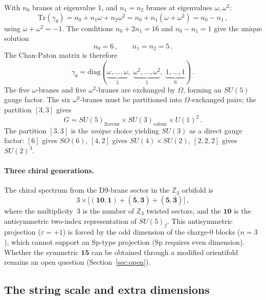 \documentclass[12pt,a4paper]{article}
\begin{document}
With $n_0$ branes at eigenvalue 1, and $n_1 = n_2$ branes at
eigenvalues $\omega, \omega^2$:
\begin{equation}
  \mathrm{Tr}(\gamma_\theta) = n_0 + n_1\omega + n_2\omega^2
  = n_0 + n_1(\omega + \omega^2) = n_0 - n_1\,,
\end{equation}
using $\omega + \omega^2 = -1$.  The conditions $n_0 + 2n_1 = 16$ and
$n_0 - n_1 = 1$ give the unique solution
\begin{equation}
  n_0 = 6\,,\qquad n_1 = n_2 = 5\,.
\end{equation}
The Chan-Paton matrix is therefore
\begin{equation}
  \gamma_\theta = \mathrm{diag}(\underbrace{\omega,\ldots,\omega}_{5},\;
    \underbrace{\omega^2,\ldots,\omega^2}_{5},\;
    \underbrace{1,\ldots,1}_{6})\,.
\end{equation}
The five $\omega$-branes and five $\omega^2$-branes are exchanged by
$\Omega$, forming an $SU(5)$ gauge factor.  The six $\omega^0$-branes
must be partitioned into $\Omega$-exchanged pairs; the partition
$[3,3]$ gives
\begin{equation}
  G = SU(5)_{\mathrm{flavour}} \times SU(3)_{\mathrm{colour}}
  \times U(1)^2\,.
\end{equation}
The partition $[3,3]$ is the \emph{unique} choice yielding $SU(3)$
as a direct gauge factor: $[6]$ gives $SO(6)$, $[4,2]$ gives
$SU(4) \times SU(2)$, $[2,2,2]$ gives $SU(2)^3$.

\paragraph{Three chiral generations.}
The chiral spectrum from the D9-brane sector in the $\mathbb{Z}_3$
orbifold is
\begin{equation}
  3 \times \bigl[(\mathbf{10},\mathbf{1})
  + (\bar{\mathbf{5}},\mathbf{3})
  + (\mathbf{5},\bar{\mathbf{3}})\bigr]\,,
\end{equation}
where the multiplicity~3 is the number of $\mathbb{Z}_3$ twisted
sectors, and the $\mathbf{10}$ is the antisymmetric two-index
representation of $SU(5)_f$.  This antisymmetric projection
($\varepsilon = +1$) is forced by the odd dimension of the charge-0
blocks ($n = 3$), which cannot support an Sp-type projection (Sp
requires even dimension).  Whether the symmetric $\mathbf{15}$ can be
obtained through a modified orientifold remains an open question
(Section~\ref{sec:open}).

\subsection{The string scale and extra dimensions}
\end{document}
